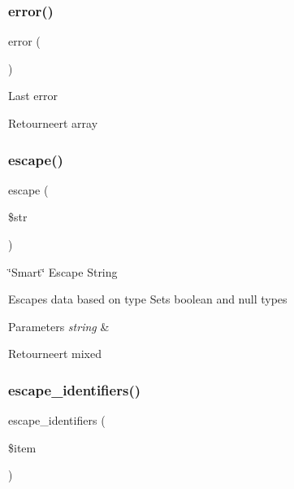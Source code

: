 \subsubsection{\texorpdfstring{error()}{error()}}
{\footnotesize\ttfamily error (\begin{DoxyParamCaption}{ }\end{DoxyParamCaption})}

Last error

\begin{DoxyReturn}{Retourneert}
array 
\end{DoxyReturn}
\mbox{\label{class_c_i___d_b__driver_ac8f37ca5703d4558c732e692194f8cd6}} 
\subsubsection{\texorpdfstring{escape()}{escape()}}
{\footnotesize\ttfamily escape (\begin{DoxyParamCaption}\item[{}]{\$str }\end{DoxyParamCaption})}

\char`\"{}\+Smart\char`\"{} Escape String

Escapes data based on type Sets boolean and null types


\begin{DoxyParams}{Parameters}
{\em string} & \\
\hline
\end{DoxyParams}
\begin{DoxyReturn}{Retourneert}
mixed 
\end{DoxyReturn}
\mbox{\label{class_c_i___d_b__driver_abe5c555644f8bac97c3f84c7d2325fdc}} 
\subsubsection{\texorpdfstring{escape\_identifiers()}{escape\_identifiers()}}
{\footnotesize\ttfamily escape\+\_\+identifiers (\begin{DoxyParamCaption}\item[{}]{\$item }\end{DoxyParamCaption})}

